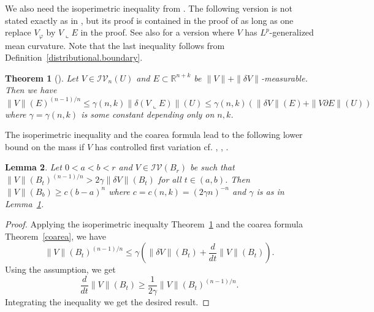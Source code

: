 \documentclass[11pt]{amsart}
\newtheorem{theorem}{Theorem}[section]
\newtheorem{lemma}[theorem]{Lemma}
\theoremstyle{definition}
\newcommand{\vp}{\varphi}
\newcommand{\R}{\mathbb{R}}
\newcommand{\IV}{\mathcal{IV}}
\begin{document}
We also need the isoperimetric inequality from \cite[Theorem 7.1]{allard1972first}. The following version is not stated exactly as in \cite[Theorem 7.1]{allard1972first}, but its proof is contained in the proof of \cite[Theorem 7.1]{allard1972first} as long as one replace $V_\vp$ by $V\llcorner E$ in the proof. See also \cite[Theorem 2.2]{menne09isoperi} for a version where $V$ has $L^p$-generalized mean curvature. Note that the last inequality follows from Definition~\ref{distributional.boundary}.
\begin{theorem}[{\cite[Theorem 7.1]{allard1972first}}]\label{isoperimetric}
Let $V\in \IV_n(U)$ and $E\subset \R^{n+k}$ be $\|V\|+\|\delta V\|$-measurable. Then we have
\[\|V\|(E)^{(n-1)/n}\le \gamma(n,k)\|\delta (V\llcorner E)\|(U)\le \gamma(n,k)(\|\delta V\|(E)+\|V\partial E\|(U))\]
where $\gamma=\gamma(n,k)$ is some constant depending only on $n,k$.
\end{theorem}
The isoperimetric inequality and the coarea formula lead to the following lower bound on the mass if $V$ has controlled first variation cf. \cite[Lemma 1]{bombieri1972harnack}, \cite[8.3]{allard1972first}, \cite[2.5]{menne09isoperi}.
\begin{lemma}\label{volbd}
    Let $0<a<b<r$ and $V\in \IV(B_r)$ be such that $\|V\|(B_t)^{(n-1)/n}> 2\gamma\|\delta V\|(B_t)$ for all $t\in(a,b)$. Then $\|V\|(B_b)\ge c(b-a)^n$ where $c=c(n,k)=(2\gamma n)^{-n}$ and $\gamma$ is as in Lemma~\ref{isoperimetric}.
\end{lemma}
\begin{proof}
    Applying the isoperimetric inequalty Theorem~\ref{isoperimetric} and the coarea formula Theorem~\ref{coarea}, we have
    \[\|V\|(B_t)^{(n-1)/n}\le \gamma(\|\delta V\|(B_t)+\frac{d}{dt}\|V\|(B_t)).\]
    Using the assumption, we get
	\[\frac{d}{dt}\|V\|(B_t)\ge \frac{1}{2\gamma} \|V\|(B_t)^{(n-1)/n}.\]
    Integrating the inequality we get the desired result.
\end{proof}


\end{document}
